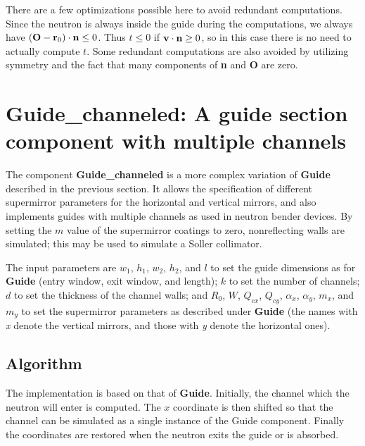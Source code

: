 There are a few optimizations possible here to avoid redundant
computations. Since the neutron is always inside the guide during the
computations, we always have
$({\bf O} - {\bf r}_0) \cdot {\bf n} \leq 0$.
Thus $t \leq 0$ if ${\bf v} \cdot {\bf n} \geq 0$, so in this case
there is no need to actually compute $t$. Some redundant computations
are also avoided by utilizing symmetry and the fact that many
components of {\bf n} and {\bf O} are zero.

\newpage

\section{Guide\_channeled: A guide section component with multiple channels}
\label{s:channeled_guide}


The component {\bf Guide\_channeled} is a more complex variation of {\bf Guide}
described in the previous section. It allows the specification
of different supermirror parameters for the horizontal and vertical
mirrors, and also implements guides with multiple channels as used in
neutron bender devices. By setting the $m$ value of the supermirror
coatings to zero, nonreflecting walls are
simulated; this may be used to simulate a Soller collimator.

The input parameters are $w_1$, $h_1$, $w_2$, $h_2$, and $l$ 
to set the guide dimensions as for {\bf Guide} 
(entry window, exit window, and length); 
$k$ to set the number of channels; $d$ to set the thickness of the
channel walls; and $R_0$, $W$, $Q_{cx}$, $Q_{cy}$, $\alpha_x$, $\alpha_y$, 
$m_x$, and $m_y$ to set the supermirror parameters as described under {\bf Guide}
(the names with \textit{x} denote the vertical mirrors, 
and those with \textit{y} denote the horizontal ones).

\subsection{Algorithm}
The implementation is based on that of {\bf Guide}. Initially, the
channel which the neutron will enter is computed. The $x$ coordinate is
then shifted so that the channel can be simulated as a single instance
of the Guide component. Finally the coordinates are restored when the
neutron exits the guide or is absorbed.

